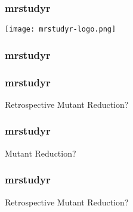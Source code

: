   \begin{frame}
    \frametitle{mrstudyr}
    \centering
    \texttt{[image: mrstudyr-logo.png]}
  \end{frame}

  \begin{frame}
    \frametitle{mrstudyr}
    \centering
    {}
  \end{frame}

  \begin{frame}
    \frametitle{mrstudyr}
    \centering
    {\HUGE Retrospective Mutant Reduction?}
  \end{frame}

  \begin{frame}
    \frametitle{mrstudyr}
    \centering
    {\HUGE {\textcolor{solarizedBlue}{Retrospective}} Mutant Reduction?}
  \end{frame}

  \begin{frame}
    \frametitle{mrstudyr}
    \centering
    {\HUGE Retrospective {\textcolor{solarizedOrange}{Mutant Reduction}}?}
  \end{frame}
